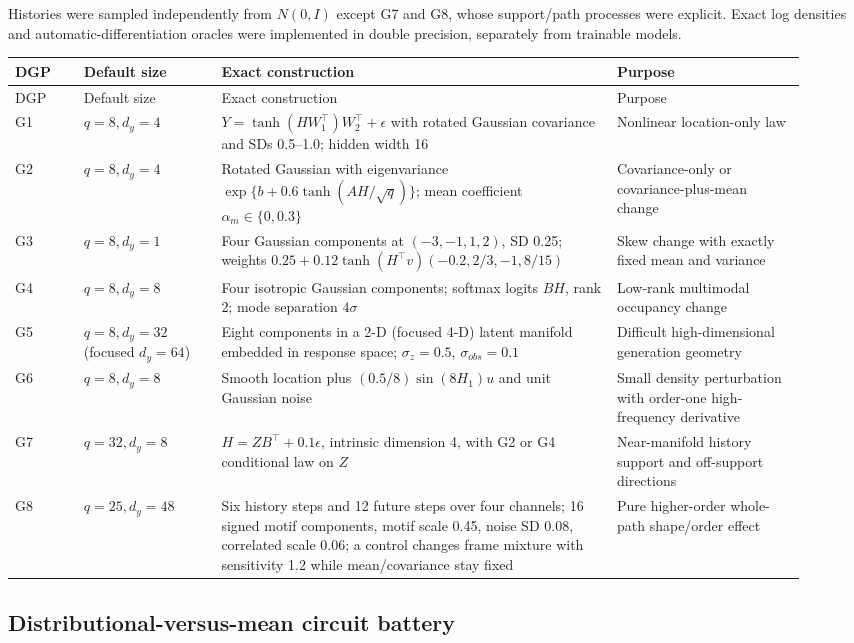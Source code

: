 \documentclass[10pt]{article}
\begin{document}
Histories were sampled independently from $N(0,I)$ except G7 and G8, whose support/path processes were explicit. Exact log densities and automatic-differentiation oracles were implemented in double precision, separately from trainable models.

\begin{longtable}{L{0.08\linewidth}L{0.16\linewidth}L{0.46\linewidth}L{0.22\linewidth}}
\toprule
DGP & Default size & Exact construction & Purpose \\
\midrule
\endfirsthead
\toprule DGP & Default size & Exact construction & Purpose \\
\midrule\endhead
G1 & $q=8,d_y=4$ & $Y=\tanh(HW_1^\top)W_2^\top+\epsilon$ with rotated Gaussian covariance and SDs 0.5--1.0; hidden width 16 & Nonlinear location-only law \\
G2 & $q=8,d_y=4$ & Rotated Gaussian with eigenvariance $\exp\{b+0.6\tanh(AH/\sqrt q)\}$; mean coefficient $\alpha_m\in\{0,0.3\}$ & Covariance-only or covariance-plus-mean change \\
G3 & $q=8,d_y=1$ & Four Gaussian components at $(-3,-1,1,2)$, SD 0.25; weights $0.25+0.12\tanh(H^\top v)(-0.2,2/3,-1,8/15)$ & Skew change with exactly fixed mean and variance \\
G4 & $q=8,d_y=8$ & Four isotropic Gaussian components; softmax logits $BH$, rank 2; mode separation $4\sigma$ & Low-rank multimodal occupancy change \\
G5 & $q=8,d_y=32$ (focused $d_y=64$) & Eight components in a 2-D (focused 4-D) latent manifold embedded in response space; $\sigma_z=0.5$, $\sigma_{obs}=0.1$ & Difficult high-dimensional generation geometry \\
G6 & $q=8,d_y=8$ & Smooth location plus $(0.5/8)\sin(8H_1)u$ and unit Gaussian noise & Small density perturbation with order-one high-frequency derivative \\
G7 & $q=32,d_y=8$ & $H=ZB^\top+0.1\epsilon$, intrinsic dimension 4, with G2 or G4 conditional law on $Z$ & Near-manifold history support and off-support directions \\
G8 & $q=25,d_y=48$ & Six history steps and 12 future steps over four channels; 16 signed motif components, motif scale 0.45, noise SD 0.08, correlated scale 0.06; a control changes frame mixture with sensitivity 1.2 while mean/covariance stay fixed & Pure higher-order whole-path shape/order effect \\
\bottomrule
\end{longtable}

\subsection{Distributional-versus-mean circuit battery}
\end{document}
